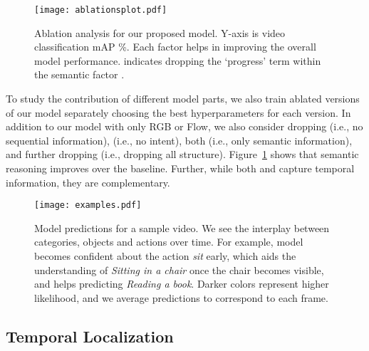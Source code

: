 \documentclass[10pt,twocolumn,letterpaper]{article}
\newcommand{\myparagraph}[1]{\vspace{.3em}\noindent{\bf #1}}
\begin{document}
\begin{figure}[tb]
\centering
\texttt{[image: ablationsplot.pdf]}
\caption{Ablation analysis for our proposed model. Y-axis is video classification mAP \%. Each factor helps in improving the overall model performance.  indicates dropping the `progress' term within the semantic factor  .}
\label{tbl:ablation}
\end{figure}

\myparagraph{Ablation studies} To study the contribution of different model parts, we also train ablated versions of our model separately choosing the best hyperparameters for each version. In addition to our model with only RGB or Flow, we also consider dropping  (i.e., no sequential information),  (i.e., no intent), both (i.e., only semantic information), and further dropping  (i.e., dropping all structure). Figure~\ref{tbl:ablation} shows that semantic reasoning improves over the baseline. Further, while both  and  capture temporal information, they are complementary. 


\begin{figure*}[th]
\centering
\texttt{[image: examples.pdf]}
\caption{Model predictions for a sample video. We see the interplay between categories, objects and actions over time. For example, model becomes confident about the action \emph{sit} early, which aids the understanding of \emph{Sitting in a chair} once the chair becomes visible, and helps predicting {\em Reading a book}. Darker colors represent higher likelihood, and we average predictions to correspond to each frame.}
\label{fig:examples}
\end{figure*}

\subsection{Temporal Localization}
\end{document}
